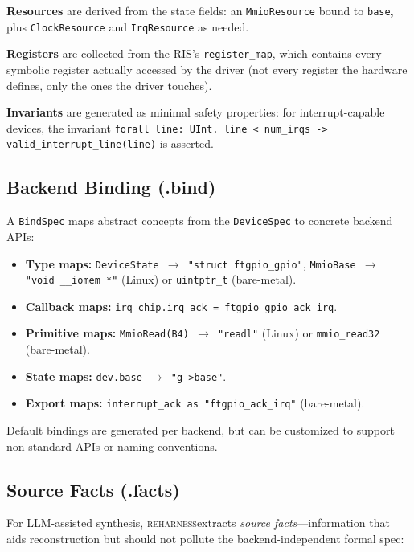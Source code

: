 \documentclass[sigconf,review]{acmart}
\newcommand{\reharness}{\textsc{reharness}}
\newcommand{\rislang}{RIS}
\begin{document}
\textbf{Resources} are derived from the state fields: an \texttt{MmioResource} bound to \texttt{base}, plus \texttt{ClockResource} and \texttt{IrqResource} as needed.

\textbf{Registers} are collected from the \rislang's \texttt{register\_map}, which contains every symbolic register actually accessed by the driver (not every register the hardware defines, only the ones the driver touches).

\textbf{Invariants} are generated as minimal safety properties: for interrupt-capable devices, the invariant \texttt{forall line: UInt. line < num\_irqs -> valid\_interrupt\_line(line)} is asserted.

\subsection{Backend Binding (.bind)}

A \texttt{BindSpec} maps abstract concepts from the \texttt{DeviceSpec} to concrete backend APIs:

\begin{itemize}
\item \textbf{Type maps:} \texttt{DeviceState $\rightarrow$ "struct ftgpio\_gpio"}, \texttt{MmioBase $\rightarrow$ "void \_\_iomem *"} (Linux) or \texttt{uintptr\_t} (bare-metal).
\item \textbf{Callback maps:} \texttt{irq\_chip.irq\_ack = ftgpio\_gpio\_ack\_irq}.
\item \textbf{Primitive maps:} \texttt{MmioRead(B4) $\rightarrow$ "readl"} (Linux) or \texttt{mmio\_read32} (bare-metal).
\item \textbf{State maps:} \texttt{dev.base $\rightarrow$ "g->base"}.
\item \textbf{Export maps:} \texttt{interrupt\_ack as "ftgpio\_ack\_irq"} (bare-metal).
\end{itemize}

Default bindings are generated per backend, but can be customized to support non-standard APIs or naming conventions.

\subsection{Source Facts (.facts)}

For LLM-assisted synthesis, \reharness extracts \emph{source facts}---information that aids reconstruction but should not pollute the backend-independent formal spec:
\end{document}

